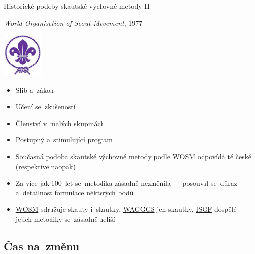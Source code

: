 \documentclass[compress, ucs, xelatex, 11pt, xcolor=dvipsnames, print,
	hyperref={
		bookmarks=true,
		unicode=true,
		colorlinks=true,
		pdftitle={Skautska vychovna metoda},
		plainpages=false,
		pdfauthor={Vojtech Zeisek},
		pdfsubject={Skautska vychovna metoda a jeji vyvoj za posledni stoleti a desetileti},
		pdfcreator={XeLaTeX},
		pdfkeywords={Junak, Pedagogika, Skaut, Skauting, Vychovna metoda},
		linkcolor=Black,
		anchorcolor=Black,
		citecolor=OliveGreen,
		filecolor=OliveGreen,
		menucolor=Black,
		urlcolor=OliveGreen,
		pdftex},
	url={hyphens, lowtilde} %
	]{beamer}
\begin{document}
\begin{frame}{Historické podoby skautské výchovné metody II}
	\begin{multicols}{2}
		\textit{World Organisation of Scout Movement}, 1977
		\begin{center}
			\includegraphics[width=2cm]{wosm.jpg}
		\end{center}
		\begin{itemize}
			\item Slib a~zákon
			\item Učení se~zkušeností
			\item Členství v~malých skupinách
			\item Postupný a~stimulující program
		\end{itemize}
	\end{multicols}
	\begin{itemize}
		\item Současná podoba \href{https://www.scout.org/method}{skautské výchovné metody podle WOSM} odpovídá té české (respektive naopak)
		\item Za více jak 100~let se~metodika zásadně nezměnila --- posouval se~důraz a~detailnost formulace některých bodů
		\item \href{https://www.scout.org/}{WOSM} sdružuje skauty i~skautky, \href{https://www.wagggs.org/}{WAGGGS} jen skautky, \href{http://www.isgf.org/}{ISGF} dospělé --- jejich metodiky se~zásadně neliší
	\end{itemize}
\end{frame}

\subsection{Čas na~změnu}
\end{document}
